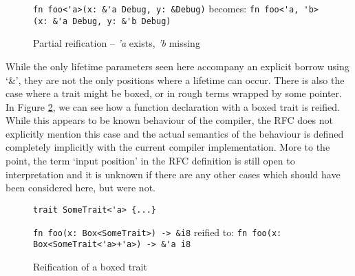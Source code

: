 \begin{figure}
{\verb|fn foo<'a>(x: &'a Debug, y: &Debug)|}\newline
becomes:\newline
{\verb|fn foo<'a, 'b>(x: &'a Debug, y: &'b Debug)|}
\caption{Partial reification -- \emph{'a} exists, \emph{'b} missing}
\label{Fig:partialrei}
\end{figure}


While the only lifetime parameters seen here accompany an explicit borrow using `\&', they are not the only positions where a lifetime can occur. There is also the case where a trait might be boxed, or in rough terms wrapped by some pointer. In Figure \ref{Fig:boxedtrait}, we can see how a function declaration with a boxed trait is reified. While this appears to be known behaviour of the compiler, the RFC does not explicitly mention this case and the actual semantics of the behaviour is defined completely implicitly with the current compiler implementation. More to the point, the term `input position' in the RFC definition is still open to interpretation and it is unknown if there are any other cases which should have been considered here, but were not.

\begin{figure}
\begin{verbatim}
trait SomeTrait<'a> {...}
\end{verbatim}
{\verb|fn foo(x: Box<SomeTrait>) -> &i8|}\newline
reified to: {\verb|fn foo(x: Box<SomeTrait<'a>+'a>) -> &'a i8|}
\caption{Reification of a boxed trait}
\label{Fig:boxedtrait}
\end{figure}

